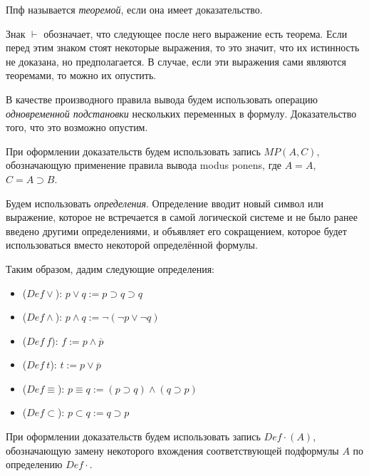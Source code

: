 \begin{definition}
    Ппф называется {\it теоремой}, если она имеет доказательство.
\end{definition}

Знак $\vdash$ обозначает, что следующее после него выражение есть теорема. Если перед этим знаком стоят некоторые выражения, то это значит, что их истинность не доказана, но предполагается. В случае, если эти выражения сами являются теоремами, то можно их опустить.

В качестве производного правила вывода будем использовать операцию {\it одновременной подстановки} нескольких переменных в формулу. Доказательство того, что это возможно опустим.

\begin{remark}
    При оформлении доказательств будем использовать запись $MP(A,C)$, обозначающую применение правила вывода modus ponens, где $A=A$, $C= A\supset B$.
\end{remark}

\begin{remark}
    Будем использовать \textit{определения}. Определение вводит новый символ или выражение, которое не встречается в самой логической системе и не было ранее введено другими определениями, и объявляет его сокращением, которое будет использоваться вместо некоторой определённой формулы.

    Таким образом, дадим следующие определения:
    \begin{itemize}
        \item ($Def\lor$): $p \lor q := p \supset q \supset q$
        \item ($Def\land$): $p \land q := \lnot(\lnot p \lor \lnot q)$
        \item ($Def\ f$): $f := p \land \overline{p}$
        \item ($Def\ t$): $t := p \lor \overline{p}$
        \item ($Def\equiv$): $p \equiv q := (p \supset q) \land (q \supset p)$
        \item ($Def\subset$): $p \subset q := q \supset p$
    \end{itemize}

    При оформлении доказательств будем использовать запись $Def\cdot(A)$, обозначающую замену некоторого вхождения соответствующей подформулы $A$ по определению $Def\cdot$.
\end{remark}
